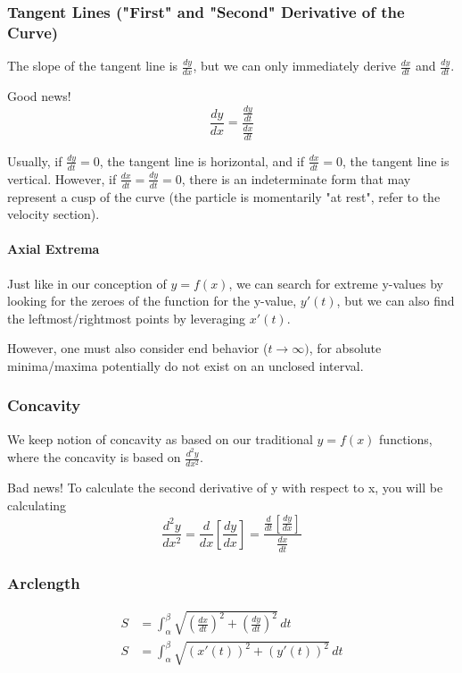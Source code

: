 \documentclass{article}
\begin{document}
\subsubsection{Tangent Lines ("First" and "Second" Derivative of the Curve)}
The slope of the tangent line is $\frac{dy}{dx}$, but we can only immediately derive $\frac{dx}{dt}$ and $\frac{dy}{dt}$.

Good news!
$$\frac{dy}{dx} = \frac{\frac{dy}{dt}}{\frac{dx}{dt}}$$

Usually, if $\frac{dy}{dt} = 0$, the tangent line is horizontal, and if $\frac{dx}{dt} = 0$, the tangent line is vertical. However, if $\frac{dx}{dt} = \frac{dy}{dt} = 0$, there is an indeterminate form that may represent a cusp of the curve (the particle is momentarily "at rest", refer to the velocity section).

\paragraph{Axial Extrema}
Just like in our conception of $y=f(x)$, we can search for extreme y-values by looking for the zeroes of the function for the y-value, $y'(t)$, but we can also find the leftmost/rightmost points by leveraging $x'(t)$.

However, one must also consider end behavior ($t \to \infty)$, for absolute minima/maxima potentially do not exist on an unclosed interval.

\subsubsection{Concavity}
We keep notion of concavity as based on our traditional $y=f(x)$ functions, where the concavity is based on $\frac{d^2y}{dx^2}$.

Bad news! To calculate the second derivative of y with respect to x, you will be calculating
$$\frac{d^2y}{dx^2} = \frac{d}{dx}\left[\frac{dy}{dx}\right] = \frac{\frac{d}{dt}\left[\frac{dy}{dx}\right]}{\frac{dx}{dt}}$$

\subsubsection{Arclength}
\begin{align*}
    S &= \int_{\alpha}^{\beta} \sqrt{\left(\frac{dx}{dt}\right)^2 + \left(\frac{dy}{dt}\right)^2} \,dt \\
    S &= \int_{\alpha}^{\beta} \sqrt{(x'(t))^2 + (y'(t))^2} \,dt
\end{align*}
\end{document}
